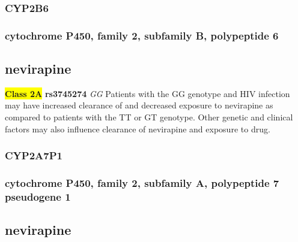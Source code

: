 \documentclass{book}
\begin{document}
\subsubsection{ CYP2B6 }
\subsubsection{ cytochrome P450, family 2, subfamily B, polypeptide 6 }

\subsection{ nevirapine }


\begin{center}


\textbf{\colorbox{yellow} {Class 2A}} \textbf{ rs3745274 } \textit{ GG }
Patients with the GG genotype and HIV infection may have increased clearance of and decreased exposure to nevirapine as compared to patients with the TT or GT genotype. Other genetic and clinical factors may also influence clearance of nevirapine and exposure to drug.


\end{center}






\subsubsection{ CYP2A7P1 }
\subsubsection{ cytochrome P450, family 2, subfamily A, polypeptide 7 pseudogene 1 }

\subsection{ nevirapine }
\end{document}
